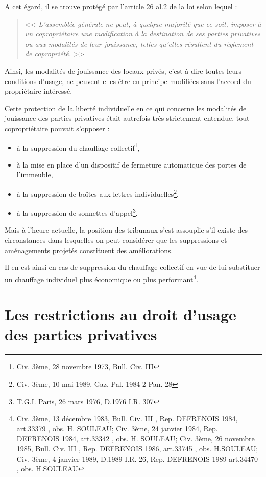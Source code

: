 		A cet égard, il se trouve protégé par l'article 26 al.2 de la loi selon lequel :
		\begin{quote}
			<< {\itshape L'assemblée générale ne peut, à quelque majorité que ce soit, imposer à un copropriétaire une modification à la destination de ses parties privatives ou aux modalités de leur jouissance, telles qu'elles résultent du règlement de copropriété.} >>
		\end{quote}
		
		Ainsi, les modalités de jouissance des locaux privés, c'est-à-dire toutes leurs conditions d'usage, ne peuvent elles être en principe modifiées sans l'accord du propriétaire intéressé.
		
		Cette protection de la liberté individuelle en ce qui concerne les modalités de jouissance des parties privatives était autrefois très strictement entendue, tout copropriétaire pouvait s'opposer :
		\begin{itemize}
			\item à la suppression du chauffage collectif\footnote{Civ. 3ème, 28 novembre 1973, Bull. Civ. III },
			\item à la mise en place d'un dispositif de fermeture automatique des portes de l'immeuble,
			\item à la suppression de boîtes aux lettres individuelles\footnote{Civ. 3ème, 10 mai 1989, Gaz. Pal. 1984 2 Pan. 28},
			\item à la suppression de sonnettes d’appel\footnote{T.G.I. Paris, 26 mars 1976, D.1976 I.R. 307}.
		\end{itemize}
		
		Mais à l'heure actuelle, la position des tribunaux s'est assouplie s'il existe des circonstances dans lesquelles on peut considérer que les suppressions et aménagements projetés constituent des améliorations.
		
		Il en est ainsi en cas de suppression du chauffage collectif en vue de lui substituer un chauffage individuel plus économique ou plus performant\footnote{Civ. 3ème, 13 décembre 1983, Bull. Civ. III , Rep. DEFRENOIS 1984, art.33379 , obs. H. SOULEAU; Civ. 3ème, 24 janvier 1984, Rep. DEFRENOIS 1984, art.33342 , obs. H. SOULEAU; Civ. 3ème, 26 novembre 1985, Bull. Civ. III , Rep. DEFRENOIS 1986, art.33745 , obs. H.SOULEAU; Civ. 3ème, 4 janvier 1989, D.1989 I.R. 26, Rep. DEFRENOIS 1989 art.34470 , obs. H.SOULEAU}.

\section{Les restrictions au droit d'usage des parties privatives}
	
